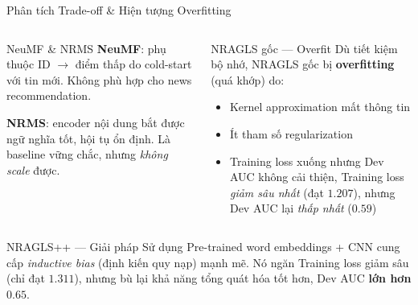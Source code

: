 \documentclass[aspectratio=169,11pt]{beamer}
\newcommand{\hl}[1]{\textcolor{accentorange}{\textbf{#1}}}
\begin{document}
\begin{frame}{Phân tích Trade-off \& Hiện tượng Overfitting}
  \begin{columns}[T]
      \begin{block}{NeuMF \& NRMS}
      \small
        \textbf{NeuMF}: phụ thuộc ID $\to$ điểm thấp
        do cold-start với tin mới.
        Không phù hợp cho news recommendation.

        \vspace{0.3em}
        \textbf{NRMS}: encoder nội dung bắt được
        ngữ nghĩa tốt, hội tụ ổn định.
        Là baseline vững chắc, nhưng \textit{không scale} được.
      \end{block}

      \begin{alertblock}{NRAGLS gốc --- Overfit}
      \scriptsize
        Dù tiết kiệm bộ nhớ, NRAGLS gốc
        bị \textbf{overfitting} (quá khớp) do:
        \begin{itemize}
          \item Kernel approximation mất thông tin
          \item Ít tham số regularization
          \item Training loss xuống nhưng
            Dev AUC không cải thiện, Training loss \textit{giảm sâu nhất} (đạt $1.207$), nhưng Dev AUC lại \textit{thấp nhất} ($0.59$)
        \end{itemize}
      \end{alertblock}
    
  \end{columns}
  \begin{exampleblock}{NRAGLS++ --- Giải pháp}
  \small
        Sử dụng Pre-trained word embeddings + CNN cung cấp \textit{inductive bias} (định kiến quy nạp) mạnh mẽ. Nó ngăn Training loss giảm sâu (chỉ đạt $1.311$), nhưng bù lại khả năng tổng quát hóa  tốt hơn, Dev AUC \hl{lớn hơn $0.65$}.
      \end{exampleblock}
\end{frame}
\end{document}
